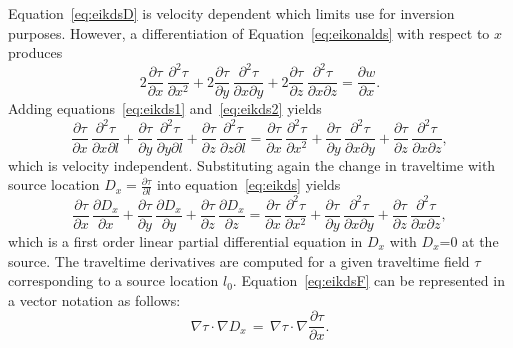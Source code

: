 Equation~\ref{eq:eikdsD} is velocity  dependent\geouline{,} which limits   use for inversion purposes. 
However, a differentiation of Equation~\ref{eq:eikonalds} with respect to $x$ produces
\begin{equation}
2 \frac{\partial \tau}{\partial x} \, \frac{\partial^2 \tau}{\partial x^2}+ 
2 \frac{\partial \tau}{\partial y} \, \frac{\partial^2 \tau}{\partial x \partial y} +
2 \frac{\partial \tau}{\partial z} \, \frac{\partial^2 \tau}{\partial x \partial z} = \frac{\partial w}{\partial x}.
\label{eq:eikds2}
\end{equation}
Adding equations~\ref{eq:eikds1} and~\ref{eq:eikds2} yields 
\begin{equation}
\frac{\partial \tau}{\partial x} \, \frac{\partial^2 \tau}{\partial x \partial l} + 
\frac{\partial \tau}{\partial y} \, \frac{\partial^2 \tau}{\partial y \partial l}+
\frac{\partial \tau}{\partial z} \, \frac{\partial^2 \tau}{\partial z \partial l} = \frac{\partial \tau}{\partial x} \, \frac{\partial^2 \tau}{\partial x^2}+ 
\frac{\partial \tau}{\partial y} \, \frac{\partial^2 \tau}{\partial x \partial y}+
\frac{\partial \tau}{\partial z} \, \frac{\partial^2 \tau}{\partial x \partial z},
\label{eq:eikds}
\end{equation}
which is velocity independent. Substituting again the change in
traveltime with source location $D_x=\frac{\partial \tau}{\partial l}$
into equation~\ref{eq:eikds} yields
\begin{equation}
\frac{\partial \tau}{\partial x} \, \frac{\partial D_x}{\partial x} + 
\frac{\partial \tau}{\partial y} \, \frac{\partial D_x}{\partial y}+
\frac{\partial \tau}{\partial z} \, \frac{\partial D_x}{\partial z} = \frac{\partial \tau}{\partial x} \, \frac{\partial^2 \tau}{\partial x^2}+ 
\frac{\partial \tau}{\partial y} \, \frac{\partial^2 \tau}{\partial x \partial y}+
\frac{\partial \tau}{\partial z} \, \frac{\partial^2 \tau}{\partial x \partial z},
\label{eq:eikdsF}
\end{equation}
which is a first order linear partial differential equation in $D_x$
with $D_x$=0 at the source. The traveltime derivatives are computed
for a given traveltime field $\tau$ corresponding to a source location
$l_0$.  Equation~\ref{eq:eikdsF} can be represented in a vector
notation as follows:
\begin{equation}
\nabla \tau \cdot \nabla D_x \, = \, \nabla \tau \cdot \nabla \frac{\partial \tau}{\partial x}.
\label{eq:eikdsFF}
\end{equation}

